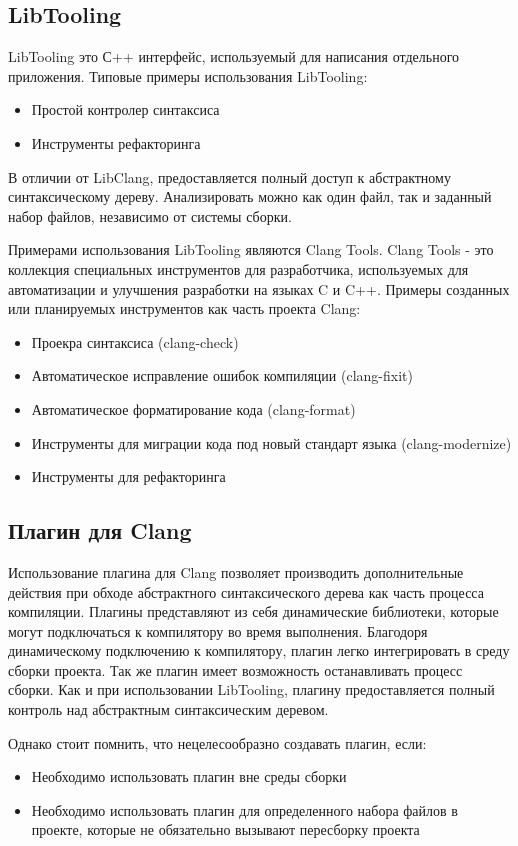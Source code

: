 \subsection*{LibTooling}
LibTooling это С++ интерфейс, используемый для написания отдельного приложения. Типовые примеры использования
LibTooling:
\begin{itemize}
	\item Простой контролер синтаксиса
	\item Инструменты рефакторинга
\end{itemize}
 
В отличии от LibClang, предоставляется полный доступ к абстрактному синтаксическому дереву. 
Анализировать можно как один файл, так и заданный набор файлов, независимо от системы сборки.

Примерами использования LibTooling являются Clang Tools. Clang Tools - это коллекция специальных 
инструментов для разработчика, используемых для автоматизации и улучшения разработки на языках C и C++.
Примеры созданных или планируемых инструментов как часть проекта Clang:
\begin{itemize}
	\item Проекра синтаксиса (clang-check)
	\item Автоматическое исправление ошибок компиляции (clang-fixit)
	\item Автоматическое форматирование кода (clang-format)
	\item Инструменты для миграции кода под новый стандарт языка (clang-modernize)
	\item Инструменты для рефакторинга
\end{itemize}

\subsection*{Плагин для Clang}
Использование плагина для Clang позволяет производить дополнительные действия при обходе абстрактного 
синтаксического дерева как часть процесса компиляции. Плагины представляют из себя динамические
библиотеки, которые могут подключаться к компилятору во время выполнения. Благодоря динамическому подключению 
к компилятору, плагин легко интегрировать в среду сборки проекта. Так же плагин имеет возможность 
останавливать процесс сборки. Как и при использовании LibTooling, плагину предоставляется полный
контроль над абстрактным синтаксическим деревом.
 
Однако стоит помнить, что нецелесообразно создавать плагин, если:
\begin{itemize}
	\item Необходимо использовать плагин вне среды сборки
	\item Необходимо использовать плагин для определенного набора файлов в проекте, которые 
не обязательно вызывают пересборку проекта
\end{itemize}


